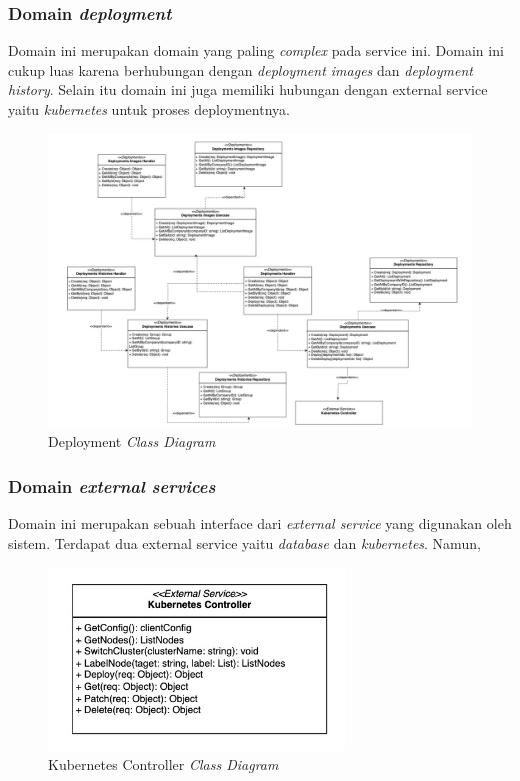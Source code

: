 \pagebreak

\subsubsection{Domain \textit{deployment}}

Domain ini merupakan domain yang paling \textit{complex} pada service ini. Domain ini cukup luas karena berhubungan dengan \textit{deployment images} dan \textit{deployment history}. Selain itu domain ini juga memiliki hubungan dengan external service yaitu \textit{kubernetes} untuk proses deploymentnya.

\begin{figure}[ht]
  \centering
  \includegraphics[width=1\textwidth]{resources/chapter-3/class/deployment-class-diagram.jpg}
  \caption{Deployment \textit{Class Diagram}}
  \label{fig:deployment-class-diagram}
\end{figure}

\subsubsection{Domain \textit{external services}}

Domain ini merupakan sebuah interface dari \textit{external service} yang digunakan oleh sistem. Terdapat dua external service yaitu \textit{database} dan \textit{kubernetes}. Namun,

\begin{figure}[ht]
  \centering
  \includegraphics[width=0.7\textwidth]{resources/chapter-3/class/kubernetes-controller}
  \caption{Kubernetes Controller \textit{Class Diagram}}
  \label{fig:kubernetes-controller-class-diagram}
\end{figure}